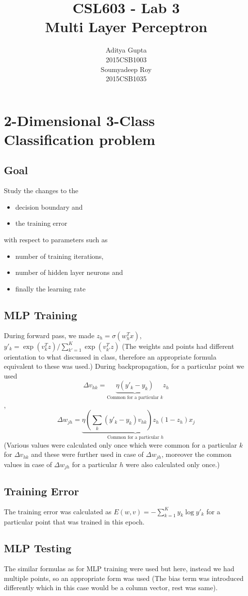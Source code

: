 \documentclass{article}
\title{CSL603 - Lab 3\\Multi Layer Perceptron}
\author{Aditya Gupta\\2015CSB1003\\Soumyadeep Roy\\2015CSB1035}
\begin{document}
\maketitle
\section{2-Dimensional 3-Class Classification problem}
\subsection{Goal} Study the changes to the 
\begin{itemize}
\item decision boundary and 
\item the training error
\end{itemize} with respect to parameters such as 
\begin{itemize}
\item number of training iterations,
\item number of hidden layer neurons and
\item finally the learning rate
\end{itemize}
\subsection{MLP Training}
During forward pass, we made $z_h=\sigma(w_h^Tx)$, $y'_k=\exp(v_k^Tz)/\sum_{k'=1}^K \exp(v_{k'}^Tz)$ (The weights and points had different orientation to what discussed in class, therefore an appropriate formula equivalent to these was used.)
During backpropagation, for a particular point we used $$\Delta v_{hk}=\underbrace{\eta(y'_k-y_k)}_{\text{Common for a particular } k}z_h$$, $$\Delta w_{jh}=\underbrace{\eta\left(\sum_k(y'_k-y_k)v_{hk}\right)z_h(1-z_h)}_{\text{Common for a particular }h}x_j$$ (Various values were calculated only once which were common for a particular $k$ for $\Delta v_{hk}$ and these were further used in case of $\Delta w_{jh}$, moreover the common values in case of $\Delta w_{jh}$ for a particular $h$ were also calculated only once.)
\subsection{Training Error}
The training error was calculated as $E(w,v)=-\sum_{k=1}^K y_k\log y'_k$ for a particular point that was trained in this epoch.
\subsection{MLP Testing}
The similar formulas as for MLP training were used but here, instead we had multiple points, so an appropriate form was used (The bias term was introduced differently which in this case would be a column vector, rest was same).
\end{document}
